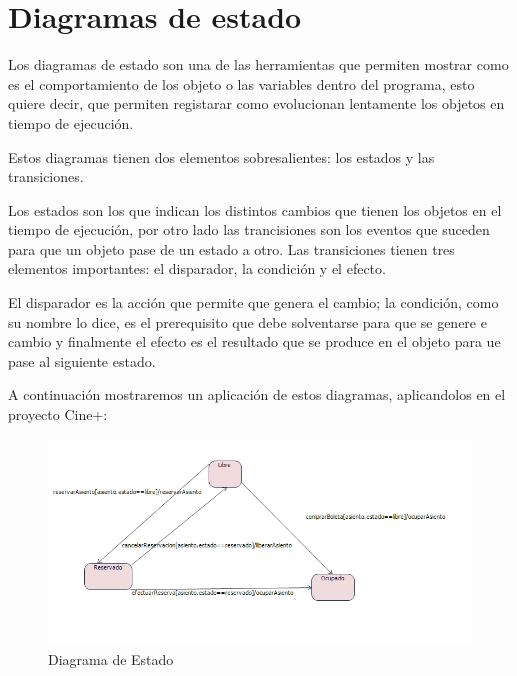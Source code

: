 \chapter{Diagramas de estado}
Los diagramas de estado son una de las herramientas que permiten mostrar como es el comportamiento de los objeto o las variables dentro del programa, esto quiere decir, que permiten registarar como evolucionan lentamente los objetos en tiempo de ejecución.

Estos diagramas tienen dos elementos sobresalientes: los estados y las transiciones.

Los estados son los que indican los distintos cambios que tienen los objetos en el tiempo de ejecución, por otro lado las trancisiones son los eventos que suceden para que un objeto pase de un estado a otro. Las transiciones tienen tres elementos importantes: el disparador, la condición y el efecto.

El disparador es la acción que permite que genera el cambio; la condición, como su nombre lo dice, es el prerequisito que debe solventarse para que se genere e cambio y finalmente el efecto es el resultado que se produce en el objeto para ue pase al siguiente estado.

A continuación mostraremos un aplicación de estos diagramas, aplicandolos en el proyecto Cine+:
\begin{figure}[h!]
	\centering
		\includegraphics[scale=0.4]{diseno/estado/imgs/estado}
	\caption{Diagrama de Estado}
\end{figure}

